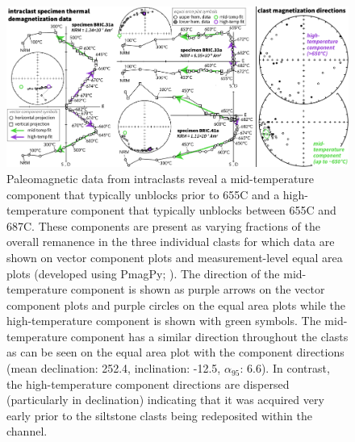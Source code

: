 \documentclass[11pt,letterpaper]{article}
\begin{document}
\begin{figure}[!ht]
\noindent\includegraphics[width=\textwidth]{BRIC_pmag.pdf}
\caption{\small{Paleomagnetic data from intraclasts reveal a mid-temperature component that typically unblocks prior to 655\textdegree C and a high-temperature component that typically unblocks between 655\textdegree C and 687\textdegree C. These components are present as varying fractions of the overall remanence in the three individual clasts for which data are shown on vector component plots and measurement-level equal area plots (developed using PmagPy; \citealp{Tauxe2016a}). The direction of the mid-temperature component is shown as purple arrows on the vector component plots and purple circles on the equal area plots while the high-temperature component is shown with green symbols. The mid-temperature component has a similar direction throughout the clasts as can be seen on the equal area plot with the component directions (mean declination: 252.4, inclination: -12.5, $\alpha_{95}$: 6.6). In contrast, the high-temperature component directions are dispersed (particularly in declination) indicating that it was acquired very early prior to the siltstone clasts being redeposited within the channel.}}
\label{fig:intraclast_pmag}
\end{figure}
\end{document}
